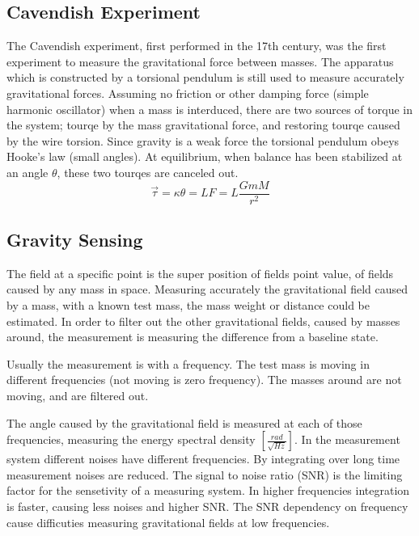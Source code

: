 \documentclass[\main/master.tex]{subfiles}
\begin{document}
\subsection{Cavendish Experiment}
The Cavendish experiment, first performed in the 17th century, was the first experiment to measure the gravitational force between masses. The apparatus which is constructed by a torsional pendulum is still used to measure accurately gravitational forces. Assuming no friction or other damping force (simple harmonic oscillator) when a mass is interduced, there are two sources of torque in the system; tourqe by the mass gravitational force, and restoring tourqe caused by the wire torsion. Since gravity is a weak force the torsional pendulum obeys Hooke’s law (small angles). At equilibrium, when balance has been stabilized at an angle $\theta$, these two tourqes are canceled out.
\begin{equation}
\overrightarrow{\tau} = \kappa\theta = LF = L\frac{GmM}{r^2}    \label{eqn:gravitation_tourqe}
\end{equation}


\subsection{Gravity Sensing}
The field at a specific point is the super position of fields point value, of fields caused by any mass in space. Measuring accurately the gravitational field caused by a mass, with a known test mass, the mass weight or distance could be estimated. In order to filter out the other gravitational fields, caused by masses around, the measurement is measuring the difference from a baseline state.
\par
Usually the measurement is with a frequency. The test mass is moving in different frequencies (not moving is zero frequency). The masses around are not moving, and are filtered out.
\par
The angle caused by the gravitational field is measured at each of those frequencies, measuring the energy spectral density $[\frac{rad}{\sqrt{Hz}}]$.
In the measurement system different noises have different frequencies. By integrating over long time measurement noises are reduced. The signal to noise ratio (SNR) is the limiting factor for the sensetivity of a measuring system. In higher frequencies integration is faster, causing less noises and higher SNR.
The SNR dependency on frequency cause difficuties measuring gravitational fields at low frequencies.
\end{document}
